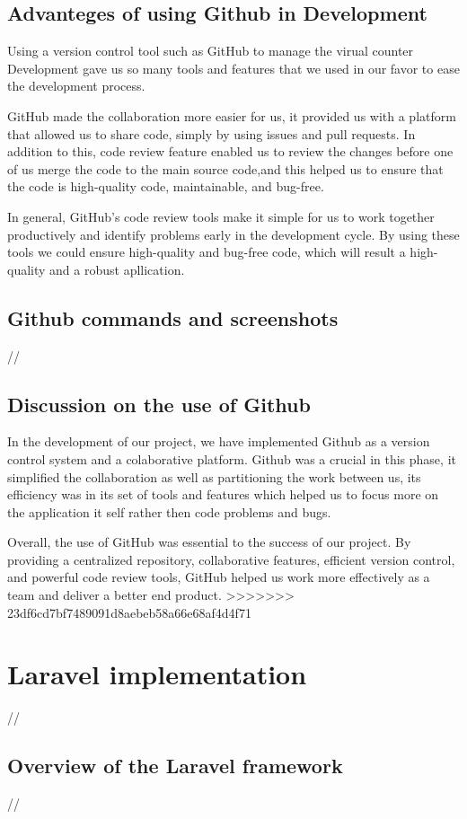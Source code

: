 \subsection{Advanteges of using Github in Development}
Using a version control tool such as GitHub to manage the virual counter Development gave us so many tools and features that we used in our favor to ease the development process.

\medskip GitHub made the collaboration more easier for us, it provided us with a platform that allowed us to share code, simply by using issues and pull requests. In addition to this, code review feature enabled us to review the changes before one of us merge the code to the main source code,and this helped us to ensure that the code is high-quality code, maintainable, and bug-free.

In general, GitHub's code review tools make it simple for us to work together productively and identify problems early in the development cycle. By using these tools we could ensure high-quality and bug-free code, which will result a high-quality and a robust apllication.
\subsection{Github commands and screenshots  }
//
\subsection{Discussion on the use of Github}
In the development of our project, we have implemented Github as a version control system and a colaborative platform. Github was a crucial in this phase, it simplified the collaboration as well as partitioning the work between us, its efficiency was in its set of tools and features which helped us to focus more on the application it self rather then code problems and bugs. 

Overall, the use of GitHub was essential to the success of our project. By providing a centralized repository, collaborative features, efficient version control, and powerful code review tools, GitHub helped us work more effectively as a team and deliver a better end product.
>>>>>>> 23df6cd7bf7489091d8aebeb58a66e68af4d4f71
\section {Laravel implementation}
//
\subsection {Overview of the Laravel framework}
//

